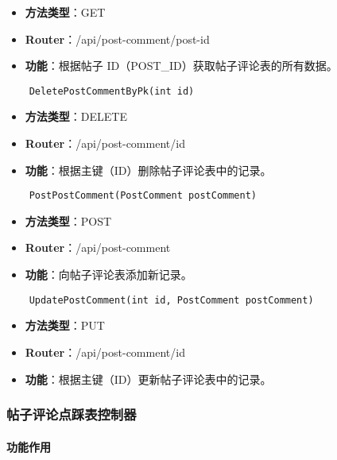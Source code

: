 \begin{itemize}
	\item \textbf{方法类型}：GET
	\item \textbf{Router}：/api/post-comment/post-{id}
	\item \textbf{功能}：根据帖子 ID（POST\_ID）获取帖子评论表的所有数据。
\end{itemize}

\begin{verbatim}
	DeletePostCommentByPk(int id)
\end{verbatim}

\begin{itemize}
	\item \textbf{方法类型}：DELETE
	\item \textbf{Router}：/api/post-comment/{id}
	\item \textbf{功能}：根据主键（ID）删除帖子评论表中的记录。
\end{itemize}

\begin{verbatim}
	PostPostComment(PostComment postComment)
\end{verbatim}

\begin{itemize}
	\item \textbf{方法类型}：POST
	\item \textbf{Router}：/api/post-comment
	\item \textbf{功能}：向帖子评论表添加新记录。
\end{itemize}

\begin{verbatim}
	UpdatePostComment(int id, PostComment postComment)
\end{verbatim}

\begin{itemize}
	\item \textbf{方法类型}：PUT
	\item \textbf{Router}：/api/post-comment/{id}
	\item \textbf{功能}：根据主键（ID）更新帖子评论表中的记录。
\end{itemize}

\subsubsection{帖子评论点踩表控制器}

\paragraph{功能作用}

